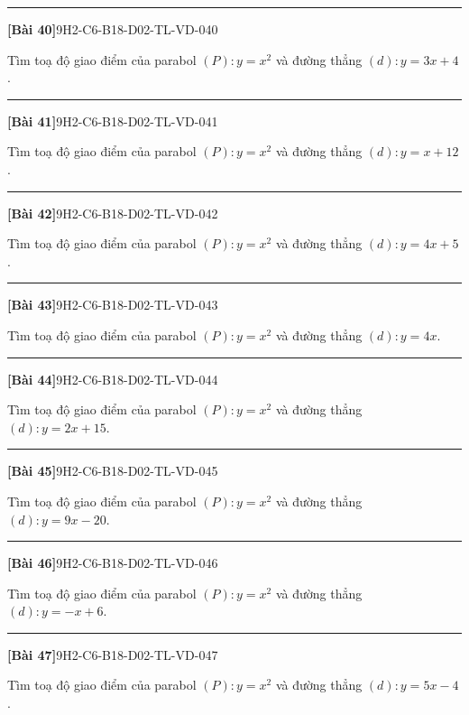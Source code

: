 \documentclass[12pt,a4paper]{article}
\newif\ifloigiai
\newenvironment{cauhoi}[2]{%
  \par\medskip\noindent\rule{\textwidth}{0.4pt}\par\nopagebreak
  \noindent\textbf{[#1]}\hfill{\scriptsize\ttfamily #2}\par\nopagebreak\smallskip}{\par}
\newcommand{\loigiai}[1]{\ifloigiai\par\smallskip\noindent\textit{Lời giải.} #1\par\fi}
\begin{document}
\begin{cauhoi}{Bài 40}{9H2-C6-B18-D02-TL-VD-040}
Tìm toạ độ giao điểm của parabol $(P): y=x^{2}$ và đường thẳng $(d): y=3x+4$.
\loigiai{Phương trình hoành độ giao điểm: $x^{2}=3x+4$ hay $x^{2}-3x-4=0$, có hai nghiệm $x=-1$ và $x=4$. Giao điểm là $(-1;1)$ và $(4;16)$.}
\end{cauhoi}
\begin{cauhoi}{Bài 41}{9H2-C6-B18-D02-TL-VD-041}
Tìm toạ độ giao điểm của parabol $(P): y=x^{2}$ và đường thẳng $(d): y=x+12$.
\loigiai{Phương trình hoành độ giao điểm: $x^{2}=x+12$ hay $x^{2}-x-12=0$, có hai nghiệm $x=-3$ và $x=4$. Giao điểm là $(-3;9)$ và $(4;16)$.}
\end{cauhoi}
\begin{cauhoi}{Bài 42}{9H2-C6-B18-D02-TL-VD-042}
Tìm toạ độ giao điểm của parabol $(P): y=x^{2}$ và đường thẳng $(d): y=4x+5$.
\loigiai{Phương trình hoành độ giao điểm: $x^{2}=4x+5$ hay $x^{2}-4x-5=0$, có hai nghiệm $x=-1$ và $x=5$. Giao điểm là $(-1;1)$ và $(5;25)$.}
\end{cauhoi}
\begin{cauhoi}{Bài 43}{9H2-C6-B18-D02-TL-VD-043}
Tìm toạ độ giao điểm của parabol $(P): y=x^{2}$ và đường thẳng $(d): y=4x$.
\loigiai{Phương trình hoành độ giao điểm: $x^{2}=4x$ hay $x^{2}-4x+0=0$, có hai nghiệm $x=0$ và $x=4$. Giao điểm là $(0;0)$ và $(4;16)$.}
\end{cauhoi}
\begin{cauhoi}{Bài 44}{9H2-C6-B18-D02-TL-VD-044}
Tìm toạ độ giao điểm của parabol $(P): y=x^{2}$ và đường thẳng $(d): y=2x+15$.
\loigiai{Phương trình hoành độ giao điểm: $x^{2}=2x+15$ hay $x^{2}-2x-15=0$, có hai nghiệm $x=-3$ và $x=5$. Giao điểm là $(-3;9)$ và $(5;25)$.}
\end{cauhoi}
\begin{cauhoi}{Bài 45}{9H2-C6-B18-D02-TL-VD-045}
Tìm toạ độ giao điểm của parabol $(P): y=x^{2}$ và đường thẳng $(d): y=9x-20$.
\loigiai{Phương trình hoành độ giao điểm: $x^{2}=9x-20$ hay $x^{2}-9x+20=0$, có hai nghiệm $x=4$ và $x=5$. Giao điểm là $(4;16)$ và $(5;25)$.}
\end{cauhoi}
\begin{cauhoi}{Bài 46}{9H2-C6-B18-D02-TL-VD-046}
Tìm toạ độ giao điểm của parabol $(P): y=x^{2}$ và đường thẳng $(d): y=-x+6$.
\loigiai{Phương trình hoành độ giao điểm: $x^{2}=-x+6$ hay $x^{2}+x-6=0$, có hai nghiệm $x=-3$ và $x=2$. Giao điểm là $(-3;9)$ và $(2;4)$.}
\end{cauhoi}
\begin{cauhoi}{Bài 47}{9H2-C6-B18-D02-TL-VD-047}
Tìm toạ độ giao điểm của parabol $(P): y=x^{2}$ và đường thẳng $(d): y=5x-4$.
\loigiai{Phương trình hoành độ giao điểm: $x^{2}=5x-4$ hay $x^{2}-5x+4=0$, có hai nghiệm $x=1$ và $x=4$. Giao điểm là $(1;1)$ và $(4;16)$.}
\end{cauhoi}
\end{document}
